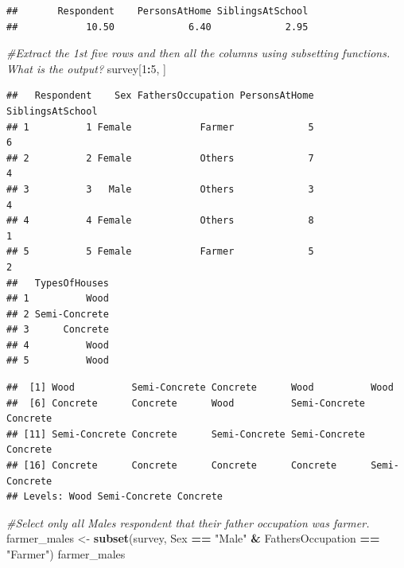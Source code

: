 \documentclass[
]{article}
\newenvironment{Shaded}{\begin{snugshade}}{\end{snugshade}}
\newcommand{\CommentTok}[1]{\textcolor[rgb]{0.56,0.35,0.01}{\textit{#1}}}
\newcommand{\DecValTok}[1]{\textcolor[rgb]{0.00,0.00,0.81}{#1}}
\newcommand{\FunctionTok}[1]{\textcolor[rgb]{0.13,0.29,0.53}{\textbf{#1}}}
\newcommand{\NormalTok}[1]{#1}
\newcommand{\OtherTok}[1]{\textcolor[rgb]{0.56,0.35,0.01}{#1}}
\newcommand{\SpecialCharTok}[1]{\textcolor[rgb]{0.81,0.36,0.00}{\textbf{#1}}}
\newcommand{\StringTok}[1]{\textcolor[rgb]{0.31,0.60,0.02}{#1}}
\begin{document}
\begin{verbatim}
##       Respondent    PersonsAtHome SiblingsAtSchool 
##            10.50             6.40             2.95
\end{verbatim}

\begin{Shaded}
\begin{Highlighting}[]
\CommentTok{\#Extract the 1st five rows and then all the columns using subsetting functions. What is the output?}
\NormalTok{survey[}\DecValTok{1}\SpecialCharTok{:}\DecValTok{5}\NormalTok{, ]}
\end{Highlighting}
\end{Shaded}

\begin{verbatim}
##   Respondent    Sex FathersOccupation PersonsAtHome SiblingsAtSchool
## 1          1 Female            Farmer             5                6
## 2          2 Female            Others             7                4
## 3          3   Male            Others             3                4
## 4          4 Female            Others             8                1
## 5          5 Female            Farmer             5                2
##   TypesOfHouses
## 1          Wood
## 2 Semi-Concrete
## 3      Concrete
## 4          Wood
## 5          Wood
\end{verbatim}

\begin{Shaded}
\end{Shaded}

\begin{verbatim}
##  [1] Wood          Semi-Concrete Concrete      Wood          Wood         
##  [6] Concrete      Concrete      Wood          Semi-Concrete Concrete     
## [11] Semi-Concrete Concrete      Semi-Concrete Semi-Concrete Concrete     
## [16] Concrete      Concrete      Concrete      Concrete      Semi-Concrete
## Levels: Wood Semi-Concrete Concrete
\end{verbatim}

\begin{Shaded}
\begin{Highlighting}[]
\CommentTok{\#Select only all Males respondent that their father occupation was farmer.}
\NormalTok{farmer\_males }\OtherTok{\textless{}{-}} \FunctionTok{subset}\NormalTok{(survey, Sex }\SpecialCharTok{==} \StringTok{"Male"} \SpecialCharTok{\&}\NormalTok{ FathersOccupation }\SpecialCharTok{==} \StringTok{"Farmer"}\NormalTok{)}
\NormalTok{farmer\_males}
\end{Highlighting}
\end{Shaded}
\end{document}
